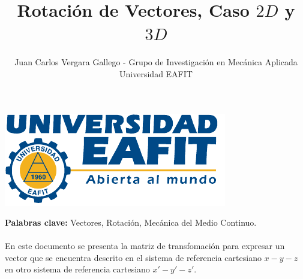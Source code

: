 \documentclass[12pt,letterpaper]{article}
\author{Juan Carlos Vergara Gallego - Grupo de Investigación en Mecánica Aplicada \\ Universidad EAFIT}
\title{\textbf{Rotación de Vectores, Caso $2D$ y $3D$}}
\begin{document}
\pagestyle{fancyplain}
\fancyhf{}
\headheight=20pt %
\renewcommand{\headrulewidth}{0pt} %

\lhead %
{
\begin{minipage}{3cm}
\includegraphics[width=1.5 in]{img/logo.pdf}
\end{minipage}
}

\fancyfoot[c]{\thepage}

\maketitle


{\bf Palabras clave:} Vectores, Rotación, Mecánica del Medio Continuo.\\\\

\abstract
%
En este documento se presenta la matriz de transfomación para expresar un vector que se encuentra descrito en el sistema de referencia cartesiano $x-y-z$ en otro sistema de referencia cartesiano $x'-y'-z'$.
%
%
\end{document}
